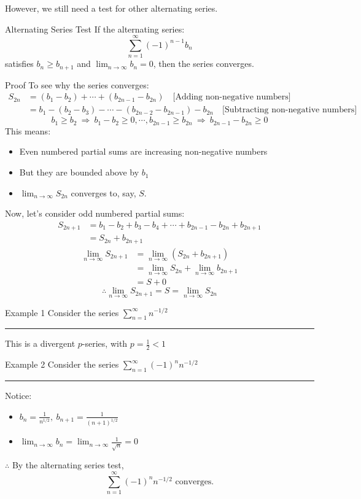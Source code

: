 \documentclass[12pt,a4paper]{article}
\begin{document}
However, we still need a test for other alternating series. 
\begin{thm}{Alternating Series Test}
	If the alternating series: $$\sum_{n=1}^\infty(-1)^{n-1}b_n$$ satisfies $b_n\geq b_{n+1}$ and $\displaystyle\lim_{n\to\infty}b_n=0$, then the series converges. 
\end{thm}
\begin{prf}{Proof}
	To see why the series converges: 
	$$\begin{aligned}
		S_{2n}&=(b_1-b_2)+\cdots+(b_{2n-1}-b_{2n})\quad\text{[Adding non-negative numbers]}\\
		&=b_1-(b_2-b_3)-\cdots-(b_{2n-2}-b_{2n-1})-b_{2n}\quad\text{[Subtracting non-negative numbers]}
	\end{aligned}$$	
	$$b_1\geq b_2\ \Rightarrow\ b_1-b_2\geq0, \cdots, b_{2n-1}\geq b_{2n}\ \Rightarrow\ b_{2n-1}-b_{2n}\geq0$$
	This means: 
	\begin{itemize}
		\item Even numbered partial sums are increasing non-negative numbers
		\item But they are bounded above by $b_1$
		\item $\displaystyle\lim_{n\to\infty}S_{2n}$ converges to, say, $S$.	
	\end{itemize}
	Now, let's consider odd numbered partial sums: 
	$$\begin{aligned}
		S_{2n+1}&=b_1-b_2+b_3-b_4+\cdots+b_{2n-1}-b_{2n}+b_{2n+1}\\
		&=S_{2n}+b_{2n+1}
	\end{aligned}$$
	$$\begin{aligned}
		\lim_{n\to\infty}S_{2n+1}&=\lim_{n\to\infty}\left(S_{2n}+b_{2n+1}\right)\\
		&=\lim_{n\to\infty}S_{2n}+\lim_{n\to\infty}b_{2n+1}\\
		&=S+0
	\end{aligned}$$
	$$\therefore \lim_{n\to\infty}S_{2n+1}=S=\lim_{n\to\infty}S_{2n}$$
\end{prf}
\begin{eg}{Example 1}
	Consider the series $\displaystyle\sum_{n=1}^\infty n^{-1/2}$\\
	\noindent\rule[0.25\baselineskip]{\textwidth}{1pt}
	This is a divergent $p$-series, with $\displaystyle p=\frac{1}{2}<1$
\end{eg}
\begin{eg}{Example 2}
	Consider the series $\displaystyle\sum_{n=1}^\infty (-1)^nn^{-1/2}$\\
	\noindent\rule[0.25\baselineskip]{\textwidth}{1pt}
	Notice: 
	\begin{itemize}
		\item $\displaystyle b_n=\frac{1}{n^{1/2}},\ b_{n+1}=\frac{1}{(n+1)^{1/2}}$
		\item $\displaystyle\lim_{n\to\infty}b_n=\lim_{n\to\infty}\frac{1}{\sqrt{n}}=0$
	\end{itemize}
	$\therefore$ By the alternating series test, 
	$$\sum^\infty_{n=1}(-1)^nn^{-1/2}\text{ converges.}$$
\end{eg}
\end{document}

